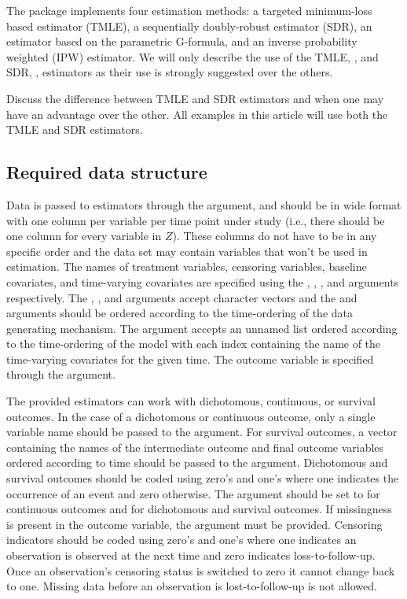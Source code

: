\documentclass[]{jss}
\begin{document}
The  package implements four estimation methods: a targeted
minimum-loss based estimator (TMLE), a sequentially doubly-robust
estimator (SDR), an estimator based on the parametric G-formula, and an inverse
probability weighted (IPW) estimator. We will only describe the use of
the TMLE, , and SDR, , estimators as
their use is strongly suggested over the others.

Discuss the difference between TMLE and SDR estimators and when one may
have an advantage over the other. All examples in this article will use
both the TMLE and SDR estimators.

\hypertarget{required-data-structure}{%
\subsection{Required data structure}\label{required-data-structure}}

Data is passed to  estimators through the 
argument, and should be in wide format with one column per variable per
time point under study (i.e., there should be one column for every
variable in \(Z\)). These columns do not have to be in any specific
order and the data set may contain variables that won't be used in
estimation. The names of treatment variables, censoring variables,
baseline covariates, and time-varying covariates are specified using the
, , , and  arguments
respectively. The , , and  arguments
accept character vectors and the  and  arguments
should be ordered according to the time-ordering of the data generating
mechanism. The  argument accepts an unnamed list ordered
according to the time-ordering of the model with each index containing
the name of the time-varying covariates for the given time. The outcome
variable is specified through the  argument.

The provided estimators can work with dichotomous, continuous, or
survival outcomes. In the case of a dichotomous or continuous outcome,
only a single variable name should be passed to the 
argument. For survival outcomes, a vector containing the names of the
intermediate outcome and final outcome variables ordered according to
time should be passed to the  argument. Dichotomous and
survival outcomes should be coded using zero's and one's where one
indicates the occurrence of an event and zero otherwise. The
 argument should be set to  for
continuous outcomes and  for dichotomous and survival
outcomes. If missingness is present in the outcome variable, the
 argument must be provided. Censoring indicators should be
coded using zero's and one's where one indicates an observation is
observed at the next time and zero indicates loss-to-follow-up. Once an
observation's censoring status is switched to zero it cannot change back
to one. Missing data before an observation is lost-to-follow-up is not
allowed.
\end{document}
